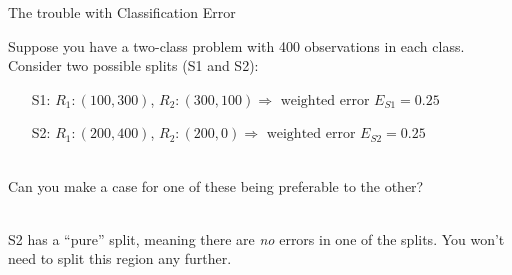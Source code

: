 \documentclass[mathserif, aspectratio=169]{beamer}
\begin{document}
\begin{frame}{The trouble with Classification Error}

Suppose you have a two-class problem with 400 observations in each class.  Consider two possible splits (S1 and S2):
\begin{itemize}
\item[S1:] $R_1: (100,300)$, $R_2: (300,100)\Rightarrow \text{ weighted error } E_{S1} = 0.25$
\item[S2:]  $R_1: (200,400)$, $R_2: (200,0)\Rightarrow \text{ weighted error }E_{S2} = 0.25$\\~\\
\end{itemize}

Can you make a case for one of these being preferable to the other?\\~\\

\pause

S2 has a ``pure'' split, meaning there are \textit{no} errors in one of the splits.  You won't need to split this region any further.  

\end{frame}
\end{document}
